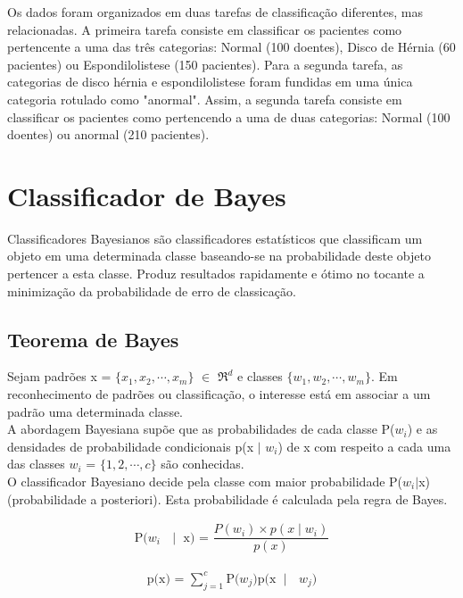 \documentclass[a4paper]{article}
\begin{document}
Os dados foram organizados em duas tarefas de classificação diferentes, mas relacionadas. A primeira tarefa consiste em classificar os pacientes como pertencente a uma das três categorias: Normal (100 doentes), Disco de Hérnia (60 pacientes) ou Espondilolistese (150 pacientes). Para a segunda tarefa, as categorias de disco hérnia e espondilolistese foram fundidas em uma única categoria rotulado como "anormal". Assim, a segunda tarefa consiste em classificar os pacientes como pertencendo a uma de duas categorias: Normal (100 doentes) ou anormal (210 pacientes).


\section{Classificador de Bayes}

Classificadores Bayesianos são classificadores estatísticos que classificam um objeto em uma determinada classe baseando-se na probabilidade deste objeto pertencer a esta classe. Produz resultados rapidamente e ótimo no tocante a minimização da probabilidade de erro de classicação.


\subsection{Teorema de Bayes}

Sejam padrões x = $\{x_1, x_2, \cdots, x_m\}$ $\in$ $\Re^d$ e classes $\{w_1, w_2, \cdots, w_m\}$. Em reconhecimento de padrões ou classificação, o interesse está em associar a um padrão uma determinada classe.\\

A abordagem Bayesiana supõe que as probabilidades de cada classe P($w_i$) e as densidades de probabilidade condicionais p(x $\mid$ $w_i$) de x com respeito a cada uma das classes $w_i$ = $\{1, 2, \cdots, c\}$ são conhecidas.\\

O classificador Bayesiano decide pela classe com maior probabilidade P($w_i$$\mid$x) (probabilidade a posteriori). Esta probabilidade é calculada pela regra de Bayes. 

\begin{align}
\text {P($w_i$ $\mid$ x) = $\dfrac{P(w_i) \times p(x \mid w_i)}{p(x)}$}
\end{align}

\begin{align}
\text {p(x) = $\sum_{j=1}^{c}$P($w_j$)p(x $\mid$ $w_j$)}
\end{align}
\end{document}
